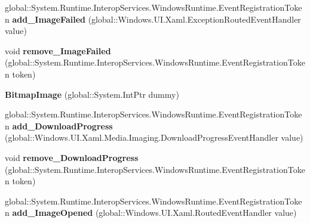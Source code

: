 \begin{DoxyCompactItemize}
\item 
\mbox{\label{class_windows_1_1_u_i_1_1_xaml_1_1_media_1_1_imaging_1_1_bitmap_image_ada8ed4999b6cb99d62a42b9ebf4c4313}} 
global\+::\+System.\+Runtime.\+Interop\+Services.\+Windows\+Runtime.\+Event\+Registration\+Token {\bfseries add\+\_\+\+Image\+Failed} (global\+::\+Windows.\+U\+I.\+Xaml.\+Exception\+Routed\+Event\+Handler value)
\item 
\mbox{\label{class_windows_1_1_u_i_1_1_xaml_1_1_media_1_1_imaging_1_1_bitmap_image_ab71236e1ec9898c1f9eb8269ae973f2f}} 
void {\bfseries remove\+\_\+\+Image\+Failed} (global\+::\+System.\+Runtime.\+Interop\+Services.\+Windows\+Runtime.\+Event\+Registration\+Token token)
\item 
\mbox{\label{class_windows_1_1_u_i_1_1_xaml_1_1_media_1_1_imaging_1_1_bitmap_image_a44808406b9149bd4c36e0a7b1ab40dc8}} 
{\bfseries Bitmap\+Image} (global\+::\+System.\+Int\+Ptr dummy)
\item 
\mbox{\label{class_windows_1_1_u_i_1_1_xaml_1_1_media_1_1_imaging_1_1_bitmap_image_ad8b669920d50527747f0632426807fbf}} 
global\+::\+System.\+Runtime.\+Interop\+Services.\+Windows\+Runtime.\+Event\+Registration\+Token {\bfseries add\+\_\+\+Download\+Progress} (global\+::\+Windows.\+U\+I.\+Xaml.\+Media.\+Imaging.\+Download\+Progress\+Event\+Handler value)
\item 
\mbox{\label{class_windows_1_1_u_i_1_1_xaml_1_1_media_1_1_imaging_1_1_bitmap_image_a2eb34dc2eba36825836cc7578bc62ad3}} 
void {\bfseries remove\+\_\+\+Download\+Progress} (global\+::\+System.\+Runtime.\+Interop\+Services.\+Windows\+Runtime.\+Event\+Registration\+Token token)
\item 
\mbox{\label{class_windows_1_1_u_i_1_1_xaml_1_1_media_1_1_imaging_1_1_bitmap_image_a009137ccb3242294d0b233b43447b15e}} 
global\+::\+System.\+Runtime.\+Interop\+Services.\+Windows\+Runtime.\+Event\+Registration\+Token {\bfseries add\+\_\+\+Image\+Opened} (global\+::\+Windows.\+U\+I.\+Xaml.\+Routed\+Event\+Handler value)

\end{DoxyCompactItemize}
